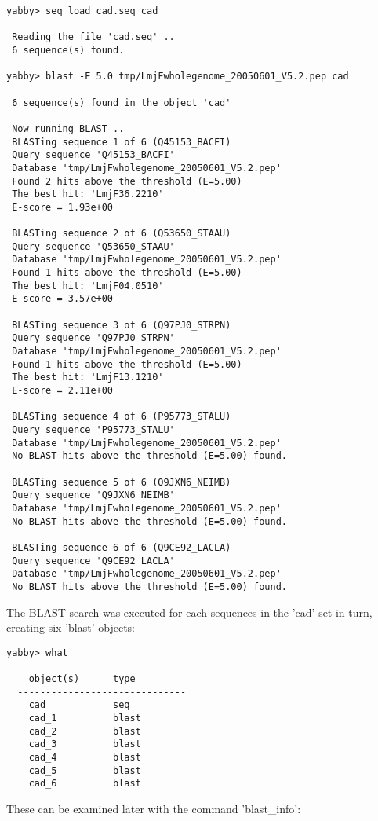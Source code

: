 \begin{verbatim}
yabby> seq_load cad.seq cad

 Reading the file 'cad.seq' ..
 6 sequence(s) found.

yabby> blast -E 5.0 tmp/LmjFwholegenome_20050601_V5.2.pep cad

 6 sequence(s) found in the object 'cad'

 Now running BLAST ..
 BLASTing sequence 1 of 6 (Q45153_BACFI)
 Query sequence 'Q45153_BACFI'
 Database 'tmp/LmjFwholegenome_20050601_V5.2.pep'
 Found 2 hits above the threshold (E=5.00)
 The best hit: 'LmjF36.2210'
 E-score = 1.93e+00

 BLASTing sequence 2 of 6 (Q53650_STAAU)
 Query sequence 'Q53650_STAAU'
 Database 'tmp/LmjFwholegenome_20050601_V5.2.pep'
 Found 1 hits above the threshold (E=5.00)
 The best hit: 'LmjF04.0510'
 E-score = 3.57e+00

 BLASTing sequence 3 of 6 (Q97PJ0_STRPN)
 Query sequence 'Q97PJ0_STRPN'
 Database 'tmp/LmjFwholegenome_20050601_V5.2.pep'
 Found 1 hits above the threshold (E=5.00)
 The best hit: 'LmjF13.1210'
 E-score = 2.11e+00

 BLASTing sequence 4 of 6 (P95773_STALU)
 Query sequence 'P95773_STALU'
 Database 'tmp/LmjFwholegenome_20050601_V5.2.pep'
 No BLAST hits above the threshold (E=5.00) found.

 BLASTing sequence 5 of 6 (Q9JXN6_NEIMB)
 Query sequence 'Q9JXN6_NEIMB'
 Database 'tmp/LmjFwholegenome_20050601_V5.2.pep'
 No BLAST hits above the threshold (E=5.00) found.

 BLASTing sequence 6 of 6 (Q9CE92_LACLA)
 Query sequence 'Q9CE92_LACLA'
 Database 'tmp/LmjFwholegenome_20050601_V5.2.pep'
 No BLAST hits above the threshold (E=5.00) found.
\end{verbatim}

The BLAST search was executed for each sequences in the 'cad' set
in turn, creating six 'blast' objects: 

\begin{verbatim}
yabby> what

    object(s)      type
  ------------------------------
    cad            seq           
    cad_1          blast         
    cad_2          blast         
    cad_3          blast         
    cad_4          blast         
    cad_5          blast         
    cad_6          blast         
\end{verbatim}

These can be examined later with the command 'blast\_info':

